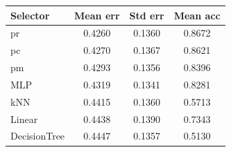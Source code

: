 \begin{tabular}{lccc}
\toprule
Selector & Mean err & Std err & Mean acc \\

\midrule
pr & 0.4260 & 0.1360 & 0.8672 \\
pc & 0.4270 & 0.1367 & 0.8621 \\
pm & 0.4293 & 0.1356 & 0.8396 \\
MLP & 0.4319 & 0.1341 & 0.8281 \\
kNN & 0.4415 & 0.1360 & 0.5713 \\
Linear & 0.4438 & 0.1390 & 0.7343 \\
DecisionTree & 0.4447 & 0.1357 & 0.5130 \\
\bottomrule
\end{tabular}
